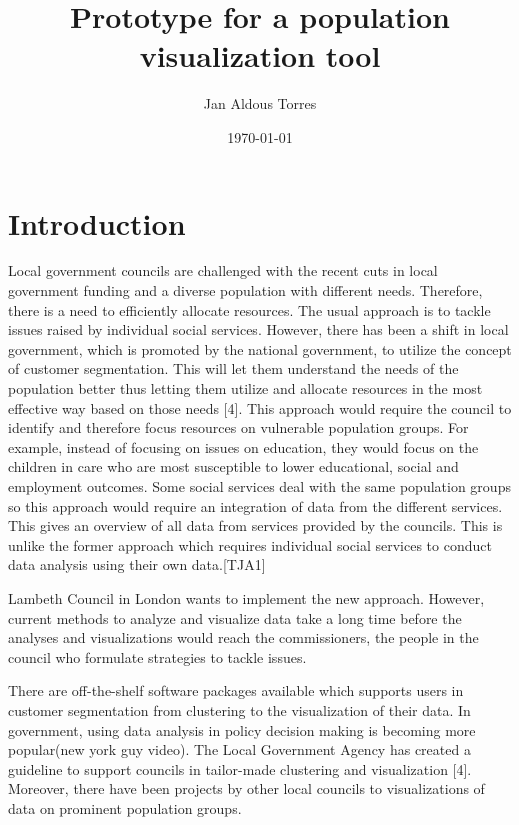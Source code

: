 \documentclass[11pt]{informatics-report}
\title{Prototype for a population visualization tool}
\author{Jan Aldous Torres}
\date{\today}
\begin{document}
\createFrontMatter
\onehalfspacing
\tableofcontents
\listoffigures
\doublespacing


\chapter{Introduction}
\cite{_developing_classification}
\cite{kent_midway}
\cite{boden_detecting_2013}
\cite{conway_data_2014}
\cite{customer_segmentaion}
\cite{graves_visualization_2013}
\cite{smart_cities}
\cite{acorn_user_guide}
\cite{gogolou_data_2016}
\cite{lga_guide}
\cite{experian}

Local government councils are challenged with the recent cuts in local government funding and a diverse population with different needs. Therefore, there is a need to efficiently allocate resources. The usual approach is to tackle issues raised by individual social services. However, there has been a shift in local government, which is promoted by the national government, to utilize the concept of customer segmentation. This will let them understand the needs of the population better thus letting them utilize and allocate resources in the most effective way based on those needs [4]. This approach would require the council to identify and therefore focus resources on vulnerable population groups. For example, instead of focusing on issues on education, they would focus on the children in care who are most susceptible to lower educational, social and employment outcomes. Some social services deal with the same population groups so this approach would require an integration of data from the different services. This gives an overview of all data from services provided by the councils. This is unlike the former approach which requires individual social services to conduct data analysis using their own data.[TJA1] \par

Lambeth Council in London wants to implement the new approach. However, current methods to analyze and visualize data take a long time before the analyses and visualizations would reach the commissioners, the people in the council who formulate strategies to tackle issues.\par
 
There are off-the-shelf software packages available which supports users in customer segmentation from clustering to the visualization of their data. In government, using data analysis in policy decision making is becoming more popular(new york guy video). The Local Government Agency has created a guideline to support councils in tailor-made clustering and visualization [4]. Moreover, there have been projects by other local councils to visualizations of data on prominent population groups. \par
\end{document}

